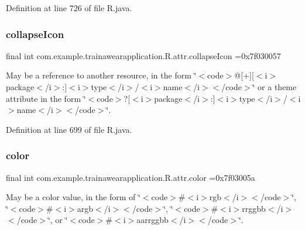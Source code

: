 Definition at line 726 of file R.\+java.

\mbox{\label{classcom_1_1example_1_1trainawearapplication_1_1_r_1_1attr_a26ff1b3be04b2712ee08021a2aef8a27}} 
\subsubsection{\texorpdfstring{collapseIcon}{collapseIcon}}
{\footnotesize\ttfamily final int com.\+example.\+trainawearapplication.\+R.\+attr.\+collapse\+Icon =0x7f030057\hspace{0.3cm}{\ttfamily [static]}}

May be a reference to another resource, in the form \char`\"{}$<$code$>$@\mbox{[}+\mbox{]}\mbox{[}$<$i$>$package$<$/i$>$\+:\mbox{]}$<$i$>$type$<$/i$>$/$<$i$>$name$<$/i$>$$<$/code$>$\char`\"{} or a theme attribute in the form \char`\"{}$<$code$>$?\mbox{[}$<$i$>$package$<$/i$>$\+:\mbox{]}$<$i$>$type$<$/i$>$/$<$i$>$name$<$/i$>$$<$/code$>$\char`\"{}. 

Definition at line 699 of file R.\+java.

\mbox{\label{classcom_1_1example_1_1trainawearapplication_1_1_r_1_1attr_a18bb9e7e95408c9cb64d48932f9bf381}} 
\subsubsection{\texorpdfstring{color}{color}}
{\footnotesize\ttfamily final int com.\+example.\+trainawearapplication.\+R.\+attr.\+color =0x7f03005a\hspace{0.3cm}{\ttfamily [static]}}

May be a color value, in the form of \char`\"{}$<$code$>$\#$<$i$>$rgb$<$/i$>$$<$/code$>$\char`\"{}, \char`\"{}$<$code$>$\#$<$i$>$argb$<$/i$>$$<$/code$>$\char`\"{}, \char`\"{}$<$code$>$\#$<$i$>$rrggbb$<$/i$>$$<$/code$>$\char`\"{}, or \char`\"{}$<$code$>$\#$<$i$>$aarrggbb$<$/i$>$$<$/code$>$\char`\"{}. 

